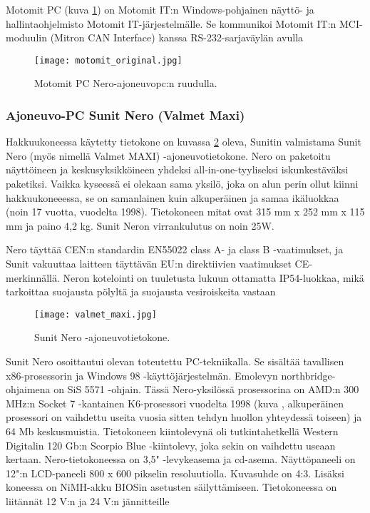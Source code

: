 Motomit PC (kuva \ref{motomit:kuvankaappaus}) on Motomit IT:n Windows-pohjainen näyttö- ja hallintaohjelmisto Motomit IT-järjestelmälle. Se kommunikoi Motomit IT:n MCI-moduulin (Mitron CAN Interface) kanssa RS-232-sarjaväylän avulla \citep{motomit:esite}
\newline
\begin{figure}[H]
\centering
\texttt{[image: motomit\_original.jpg]}
\caption{Motomit PC Nero-ajoneuvopc:n ruudulla.}
\label{motomit:kuvankaappaus}
\end{figure}

\subsubsection{Ajoneuvo-PC Sunit Nero (Valmet Maxi)}
Hakkuukoneessa käytetty tietokone on kuvassa \ref{kuva_nero} oleva, Sunitin valmistama Sunit Nero (myös nimellä Valmet MAXI) -ajoneuvotietokone. Nero on paketoitu näyttöineen ja keskusyksikköineen yhdeksi all-in-one-tyyliseksi iskunkestäväksi paketiksi. Vaikka kyseessä ei olekaan sama yksilö, joka on alun perin ollut kiinni hakkuukoneeessa, se on samanlainen kuin alkuperäinen ja samaa ikäluokkaa (noin 17 vuotta, vuodelta 1998). Tietokoneen mitat ovat 315 mm x 252 mm x 115 mm ja paino 4,2 kg. Sunit Neron virrankulutus on noin 25W.

Nero täyttää CEN:n standardin EN55022 class A- ja class B -vaatimukset, ja Sunit vakuuttaa laitteen täyttävän EU:n direktiivien vaatimukset CE-merkinnällä. Neron kotelointi on tuuletusta lukuun ottamatta IP54-luokkaa, mikä tarkoittaa suojausta pölyltä ja suojausta vesiroiskeita vastaan \citep{nero:manual}

\begin{figure}[H]
\centering
\texttt{[image: valmet\_maxi.jpg]}
\caption{Sunit Nero -ajoneuvotietokone.}
\label{kuva_nero}
\end{figure}

Sunit Nero osoittautui olevan toteutettu PC-tekniikalla. Se sisältää tavallisen x86-prosessorin ja Windows 98 -käyttöjärjestelmän. Emolevyn northbridge-ohjaimena on SiS 5571 -ohjain. Tässä Nero-yksilössä prosessorina on AMD:n 300 MHz:n Socket 7 -kantainen K6-prosessori vuodelta 1998 (kuva \label{kuva_prossu}, alkuperäinen prosessori on vaihdettu useita vuosia sitten tehdyn huollon yhteydessä toiseen) ja 64 Mb keskusmuistia. Tietokoneen kiintolevynä oli tutkintahetkellä Western Digitalin 120 Gb:n Scorpio Blue -kiintolevy, joka sekin on vaihdettu useaan kertaan. Nero-tietokoneessa on 3,5" -levykeasema ja cd-asema. Näyttöpaneeli on 12":n LCD-paneeli 800 x 600 pikselin resoluutiolla. Kuvasuhde on 4:3. Lisäksi koneessa on NiMH-akku BIOSin asetusten säilyttämiseen. Tietokoneessa on liitännät 12 V:n ja 24 V:n jännitteille \citep{nero:manual}
\newline\newline

